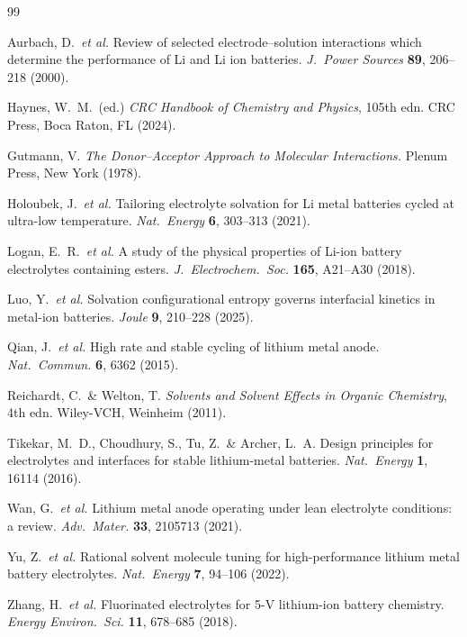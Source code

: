 \documentclass[11pt]{article}
\theoremstyle{plain}
\theoremstyle{definition}
\theoremstyle{remark}
\begin{document}
\begin{thebibliography}{99}

Aurbach, D.\ \textit{et al.}
Review of selected electrode--solution interactions which determine
the performance of Li and Li ion batteries.
\textit{J.\ Power Sources} \textbf{89}, 206--218 (2000).

Haynes, W.\ M.\ (ed.)
\textit{CRC Handbook of Chemistry and Physics}, 105th edn.
CRC Press, Boca Raton, FL (2024).

Gutmann, V.
\textit{The Donor--Acceptor Approach to Molecular Interactions.}
Plenum Press, New York (1978).

Holoubek, J.\ \textit{et al.}
Tailoring electrolyte solvation for Li metal batteries cycled at
ultra-low temperature.
\textit{Nat.\ Energy} \textbf{6}, 303--313 (2021).

Logan, E.\ R.\ \textit{et al.}
A study of the physical properties of Li-ion battery electrolytes
containing esters.
\textit{J.\ Electrochem.\ Soc.} \textbf{165}, A21--A30 (2018).

Luo, Y.\ \textit{et al.}
Solvation configurational entropy governs interfacial kinetics in
metal-ion batteries.
\textit{Joule} \textbf{9}, 210--228 (2025).

Qian, J.\ \textit{et al.}
High rate and stable cycling of lithium metal anode.
\textit{Nat.\ Commun.} \textbf{6}, 6362 (2015).

Reichardt, C.\ \& Welton, T.
\textit{Solvents and Solvent Effects in Organic Chemistry}, 4th edn.
Wiley-VCH, Weinheim (2011).

Tikekar, M.\ D., Choudhury, S., Tu, Z.\ \& Archer, L.\ A.
Design principles for electrolytes and interfaces for stable
lithium-metal batteries.
\textit{Nat.\ Energy} \textbf{1}, 16114 (2016).

Wan, G.\ \textit{et al.}
Lithium metal anode operating under lean electrolyte conditions:
a review.
\textit{Adv.\ Mater.} \textbf{33}, 2105713 (2021).

Yu, Z.\ \textit{et al.}
Rational solvent molecule tuning for high-performance lithium metal
battery electrolytes.
\textit{Nat.\ Energy} \textbf{7}, 94--106 (2022).

Zhang, H.\ \textit{et al.}
Fluorinated electrolytes for 5-V lithium-ion battery chemistry.
\textit{Energy Environ.\ Sci.} \textbf{11}, 678--685 (2018).

\end{thebibliography}
\end{document}
